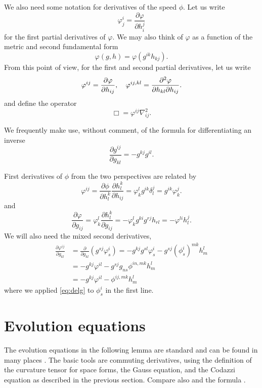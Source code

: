 \documentclass{amsart}
\begin{document}
We also need some notation for derivatives of the speed \(\phi\). Let us write
\[
\varphi^{i}_{j} = \frac{\partial \varphi}{\partial h^{j}_{i}}
\]
for the first partial derivatives of \(\varphi\). We may also think of \(\varphi\) as a function of the metric and second fundamental form
\[
\varphi(g, h) = \varphi(g^{ik} h_{kj}).
\]
From this point of view, for the first and second partial derivatives, let us write
\[
\varphi^{ij} = \frac{\partial\varphi}{\partial h_{ij}}, \quad \varphi^{ij,kl} = \frac{\partial^2\varphi}{\partial h_{kl} \partial h_{ij}}.
\]
and define the operator
\[
\Box = \varphi^{ij} \nabla^2_{ij}.
\]

We frequently make use, without comment, of the formula for differentiating an inverse
\[
\frac{\partial g^{ij}}{\partial g_{kl}} = - g^{kj} g^{il}.
\]

First derivatives of \(\phi\) from the two perspectives are related by
\begin{equation}
\label{eq:delh}
\varphi^{ij} = \frac{\partial \phi}{\partial h_l^k} \frac{\partial h_l^k}{\partial h_{ij}} = \varphi^l_k g^{ik} \delta^j_l = g^{ik} \varphi^j_k.
\end{equation}
and
\begin{equation}
\label{eq:delg}
\frac{\partial\varphi}{\partial g_{ij}} = \varphi^{l}_{k} \frac{\partial h^{k}_{l}}{\partial g_{ij}} = -\varphi^{l}_{k} g^{ki} g^{rj} h_{rl} = -\varphi^{li}h^{j}_{l}.
\end{equation}
We will also need the mixed second derivatives,
\begin{equation}
\label{eq:delhdelg}
\begin{split}
\frac{\partial \varphi^{ij}}{\partial g_{kl}} &= \frac{\partial}{\partial g_{kl}} \left(g^{sj} \varphi^{i}_{s} \right) = - g^{kj}g^{sl} \varphi^{i}_{s} - g^{sj} (\phi^i_s)^{mk} h^l_m \\
&= - g^{kj} \varphi^{il} - g^{sj} g_{ns} \phi^{in,mk} h^l_m \\
&= - g^{kj} \varphi^{il} - \phi^{ij,mk} h^l_m
\end{split}
\end{equation}
where we applied \cref{eq:delg} to \(\phi^i_s\) in the first line.

\section{Evolution equations}

The evolution equations in the following lemma are standard and can be found in many places \cite{MR1316556, MR1100812, MR1296393, MR1480081}. The basic tools are commuting derivatives, using the definition of the curvature tensor for space forms, the Gauss equation, and the Codazzi equation as described in the previous section. Compare also \cite[p.~94-95]{Gerhardt:/2006} and the formula \cite[eq.~(6.17)]{Gerhardt:01/1996}.
\end{document}

